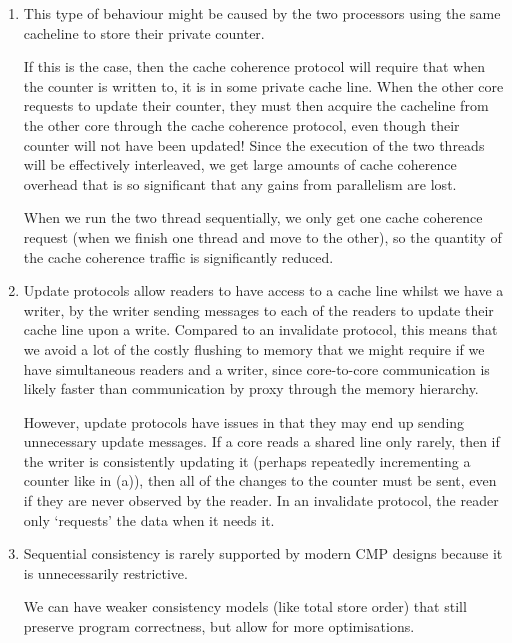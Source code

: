 


\begin{enumerate}[label=(\alph*)]
  \item

    This type of behaviour might be caused by the two processors using the same cacheline to store their private counter.

    If this is the case, then the cache coherence protocol will require that when the counter is written to, it is in some private cache line. When the other core requests to update their counter, they must then acquire the cacheline from the other core through the cache coherence protocol, even though their counter will not have been updated! Since the execution of the two threads will be effectively interleaved, we get large amounts of cache coherence overhead that is so significant that any gains from parallelism are lost.

    When we run the two thread sequentially, we only get one cache coherence request (when we finish one thread and move to the other), so the quantity of the cache coherence traffic is significantly reduced.

  \item
    Update protocols allow readers to have access to a cache line whilst we have a writer, by the writer sending messages to each of the readers to update their cache line upon a write. Compared to an invalidate protocol, this means that we avoid a lot of the costly flushing to memory that we might require if we have simultaneous readers and a writer, since core-to-core communication is likely faster than communication by proxy through the memory hierarchy.

    However, update protocols have issues in that they may end up sending unnecessary update messages. If a core reads a shared line only rarely, then if the writer is consistently updating it (perhaps repeatedly incrementing a counter like in (a)), then all of the changes to the counter must be sent, even if they are never observed by the reader. In an invalidate protocol, the reader only `requests' the data when it needs it.

  \item
    Sequential consistency is rarely supported by modern CMP designs because it is unnecessarily restrictive.

    We can have weaker consistency models (like total store order) that still preserve program correctness, but allow for more optimisations.


\end{enumerate}
